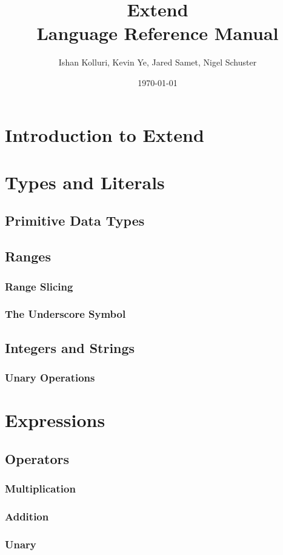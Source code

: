 \documentclass[titlepage]{article}
\title{Extend\\ Language Reference Manual}
\author{Ishan Kolluri, Kevin Ye, Jared Samet, Nigel Schuster}
\date{\today}
\begin{document}
\maketitle
\tableofcontents
\section{Introduction to Extend}
\section{Types and Literals}
\subsection{Primitive Data Types}
\subsection{Ranges}
\subsubsection{Range Slicing}
\subsubsection{The Underscore Symbol}
\subsection{Integers and Strings}
\subsubsection{Unary Operations}
\section{Expressions}
\subsection{Operators}
\subsubsection{Multiplication}
\subsubsection{Addition}
\subsubsection{Unary}
\end{document}
